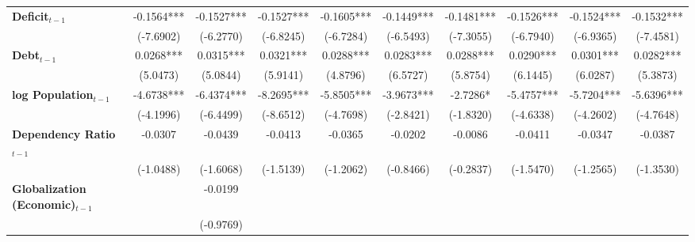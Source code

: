 \begin{center}
\begin{tabular}{lccccccccc}
\textbf{Deficit$_{t-1}$}             &     -0.1564***     &     -0.1527***     &     -0.1527***     &     -0.1605***     &     -0.1449***     &     -0.1481***     &     -0.1526***     &     -0.1524***     &     -0.1532***      \\
\textbf{ }                         &     (-7.6902)      &     (-6.2770)      &     (-6.8245)      &     (-6.7284)      &     (-6.5493)      &     (-7.3055)      &     (-6.7940)      &     (-6.9365)      &     (-7.4581)       \\
\textbf{Debt$_{t-1}$}                &     0.0268***      &     0.0315***      &     0.0321***      &     0.0288***      &     0.0283***      &     0.0288***      &     0.0290***      &     0.0301***      &     0.0282***       \\
\textbf{ }                         &      (5.0473)      &      (5.0844)      &      (5.9141)      &      (4.8796)      &      (6.5727)      &      (5.8754)      &      (6.1445)      &      (6.0287)      &      (5.3873)       \\
\textbf{log Population$_{t-1}$}      &     -4.6738***     &     -6.4374***     &     -8.2695***     &     -5.8505***     &     -3.9673***     &      -2.7286*      &     -5.4757***     &     -5.7204***     &     -5.6396***      \\
\textbf{ }                         &     (-4.1996)      &     (-6.4499)      &     (-8.6512)      &     (-4.7698)      &     (-2.8421)      &     (-1.8320)      &     (-4.6338)      &     (-4.2602)      &     (-4.7648)       \\
\textbf{Dependency Ratio$_{t-1}$}   &      -0.0307       &      -0.0439       &      -0.0413       &      -0.0365       &      -0.0202       &      -0.0086       &      -0.0411       &      -0.0347       &      -0.0387        \\
\textbf{ }                         &     (-1.0488)      &     (-1.6068)      &     (-1.5139)      &     (-1.2062)      &     (-0.8466)      &     (-0.2837)      &     (-1.5470)      &     (-1.2565)      &     (-1.3530)       \\
\textbf{Globalization (Economic)$_{t-1}$}             &                    &      -0.0199       &                    &                    &                    &                    &                    &                    &                     \\
\textbf{ }                         &                    &     (-0.9769)      &                    &                    &                    &                    &                    &                    &                     \\

\end{tabular}
\end{center}
